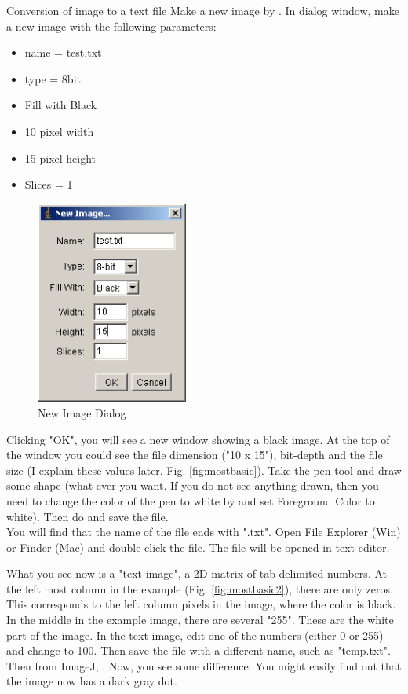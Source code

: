 \begin{indentexercise}{1}
\label{exer:1111}
\item Conversion of image to a text file
Make a new image by . In dialog window, make a new image with the following parameters:

\begin{itemize}
\item name = test.txt
\item type = 8bit
\item Fill with Black
\item 10 pixel width
\item 15 pixel height
\item Slices = 1
\end{itemize}


\begin{figure}[htbp]
\begin{center}
\includegraphics[width=5cm]{img/CMCIBasicCourse201102-img1.png}
\caption{ New Image Dialog}
\label{fig:img1}
\end{center}
\end{figure}
Clicking "OK", you will see a new window showing a black image. 
At the top of the window you could see the file dimension ("10 x 15"), 
bit-depth and the file size (I explain these values later. 
Fig. \ref{fig:mostbasic}). Take the pen tool and draw some shape (what ever you want. 
If you do not see anything drawn, then you need to change the color of the pen to white by 
 and set Foreground Color to white). 
Then do  and save the file. \\

You will find that the name of the file ends with ".txt". 
Open File Explorer (Win) or Finder (Mac) and double click the file. 
The file will be opened in text editor.

What you see now is a "text image", a 2D
matrix of tab-delimited numbers. At the left most column in the example
(Fig. \ref{fig:mostbasic2}), there are only zeros. This corresponds to the left column
pixels in the image, where the color is black. In the middle in the
example image, there are several "255".
These are the white part of the image.
In the text image, edit one of the numbers (either 0 or 255) and change
to 100. Then save the file with a different name, such as
"temp.txt". Then from ImageJ, . Now, you see some
difference. You might easily find out that the image now has a dark
gray dot.
\end{indentexercise}
